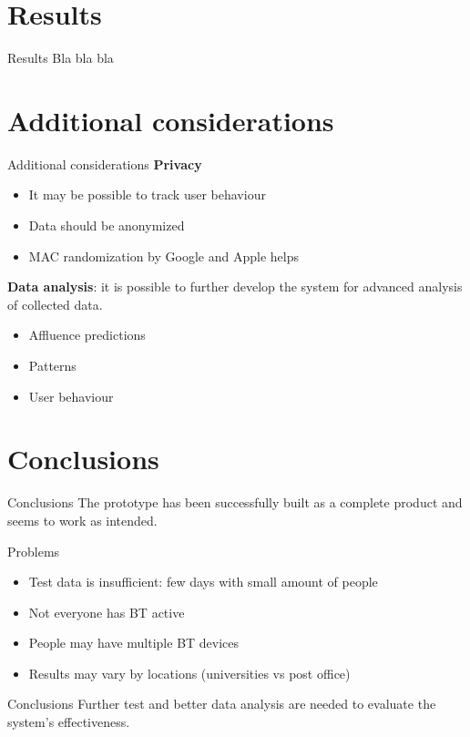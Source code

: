 \documentclass{beamer}
\begin{document}
\section{Results}
\begin{frame}{Results}
	Bla bla bla

\end{frame}


\section{Additional considerations}
\begin{frame}{Additional considerations}
	\textbf{Privacy}
	\begin{itemize}
		\item It may be possible to track user behaviour
		\item Data should be anonymized
		\item MAC randomization by Google and Apple helps
	\end{itemize}
	\vspace{.5em}
	\textbf{Data analysis}: it is possible to further develop the system for advanced analysis of collected data.
	\begin{itemize}
		\item Affluence predictions
		\item Patterns
		\item User behaviour
	\end{itemize}
\end{frame}

\section{Conclusions}
\begin{frame}{Conclusions}
	The prototype has been successfully built as a complete product and seems to work as intended.
	\begin{alertblock}{Problems}
		\begin{itemize}
			\item Test data is insufficient: few days with small amount of people
			\item Not everyone has BT active
			\item People may have multiple BT devices
			\item Results may vary by locations (universities vs post office)
		\end{itemize}
	\end{alertblock}
	\begin{exampleblock}{Conclusions}
		Further test and better data analysis are needed to evaluate the system's effectiveness.
	\end{exampleblock}

\end{frame}
\end{document}
